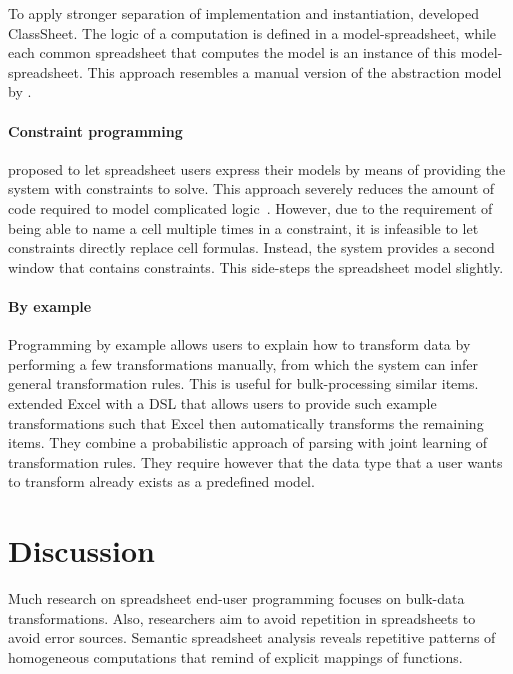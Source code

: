 \documentclass[a4paper]{article}
\begin{document}
To apply stronger separation of implementation and instantiation,
\citet{6070409} developed ClassSheet. The logic of a computation is
defined in a model-spreadsheet, while each common spreadsheet that
computes the model is an instance of this model-spreadsheet. This
approach resembles a manual version of the abstraction model by
\citet{Isakowitz:1995:TLT:195705.195708}.

\paragraph{Constraint programming}

\citet{Stadelmann:1993:SBC:168642.168664} proposed to let spreadsheet
users express their models by means of providing the system with
constraints to solve. This approach severely reduces the amount of
code required to model complicated
logic~\cite{Stadelmann:1993:SBC:168642.168664}. However, due to the
requirement of being able to name a cell multiple times in a
constraint, it is infeasible to let constraints directly replace cell
formulas. Instead, the system provides a second window that contains
constraints. This side-steps the spreadsheet model slightly.

\paragraph{By example}

Programming by example allows users to explain how to transform data
by performing a few transformations manually, from which the system
can infer general transformation rules. This is useful for
bulk-processing similar items. \citet{Singh:2016:TSD:2837614.2837668}
extended Excel with a DSL that allows users to provide such example
transformations such that Excel then automatically transforms the
remaining items. They combine a probabilistic approach of parsing with
joint learning of transformation rules. They require however that the
data type that a user wants to transform already exists as a
predefined model.

\section{Discussion}
\label{sec:discussion}

Much research on spreadsheet end-user programming focuses on bulk-data
transformations. Also, researchers aim to avoid repetition in
spreadsheets to avoid error sources. Semantic spreadsheet analysis
reveals repetitive patterns of homogeneous computations that remind of
explicit mappings of functions.
\end{document}
